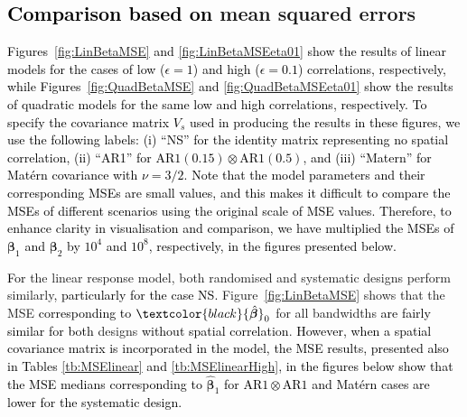 \documentclass[a4paper]{article} 	%
\newcommand{\Matern}{Mat\'ern }
\newcommand{\AR}{\mathrm{AR1}}
\newcommand{\revision}[1]{\textcolor{black}{#1}}
\newcommand{\zc}[1]{\textcolor{black}{#1}}
\begin{document}

\subsection{\revision{Comparison based on} mean squared errors}\label{Sec:MSE}


\revision{Figures~\ref{fig:LinBetaMSE} and \ref{fig:LinBetaMSEeta01} show the results of linear models for the cases of low ($\epsilon = 1$) and high ($\epsilon = 0.1$) correlations, respectively, while Figures~\ref{fig:QuadBetaMSE} and \ref{fig:QuadBetaMSEeta01} show the results of quadratic models for the same low and high correlations, respectively. To specify the covariance matrix $V_s$ used in producing the results in these figures, we use the following labels: (i) ``NS'' for the identity matrix representing no spatial correlation, (ii) ``AR1'' for $\AR(0.15)\otimes \AR(0.5)$, and (iii) ``Matern'' for \Matern covariance with $\nu=3/2$.} \zc{Note that the model parameters and their corresponding MSEs are small values, and this makes it difficult to compare the MSEs of different scenarios using the original scale of MSE values. Therefore, to enhance clarity in visualisation and comparison, we have multiplied the MSEs of $\bm{\beta}_1$ and $\bm{\beta}_2$ by $10^4$ and $10^8$, respectively, in the figures presented below. }



\revision{For} the linear response model, both randomised and systematic designs perform similarly\revision{, particularly for the case NS.} Figure~\ref{fig:LinBetaMSE} shows that the MSE \revision{corresponding to} $\zc{\hat{\bm{\beta}}}_0$ for all bandwidths \revision{are fairly similar for both} designs \zc{without spatial correlation}. \zc{However, when a spatial covariance matrix is incorporated in the model, the MSE results, presented also in Tables \ref{tb:MSElinear} and \ref{tb:MSElinearHigh}, in the figures below show that the MSE medians corresponding to $\hat{\bm{\beta}}_1$ for $\AR\otimes\AR$ and \Matern cases are lower for the systematic design.} 
\end{document}
